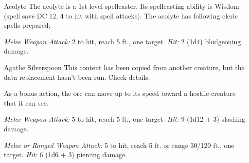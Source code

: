 \documentclass[10pt,a4paper,twoside,bg=print,twocolumn,openany,nodeprecatedcode]{dndbook}
\begin{document}
\begin{DndMonster}[float=t]{Acolyte}
\DndMonsterBasics[
armor-class = {10},
hit-points = {\DndDice{2d8}},
speed = {30 ft.}
]
\DndMonsterAbilityScores[
 str = 10,
 dex = 10,
 con = 10,
 int = 10,
 wis = 14,
 cha = 11
]
\DndMonsterDetails[
skills = {Medicine +4, Religion +2},
languages = {any one language (usually Common)},
challenge = 1/4,
]
The acolyte is a 1st-level spellcaster. Its spellcasting ability is Wisdom (spell save DC 12, 4 to hit with spell attacks). The acolyte has following cleric spells prepared:
\begin{DndMonsterSpells}
\end{DndMonsterSpells}
\textsl{Melee Weapon Attack:} 2 to hit, reach 5 ft., one target. \textsl{Hit:} 2 (1d4) bludgeoning damage.

\end{DndMonster}



\begin{DndMonster}[float=t]{Agathe Silverspoon}
\DndMonsterBasics[
armor-class = {13 (\textit{hide armor})},
hit-points = {\DndDice{2d8 + 6}},
speed = {30 ft.}
]
\DndMonsterAbilityScores[
 str = 16,
 dex = 12,
 con = 16,
 int = 7,
 wis = 11,
 cha = 10
]
\DndMonsterDetails[
skills = {Intimidation +2},
senses = {darkvision 60 ft., passive perception 10},
languages = {Common, Orc},
challenge = 1/2,
]
This content has been copied from another creature, but the data replacement hasn't been run. Check details.

As a bonus action, the orc can move up to its speed toward a hostile creature that it can see.

\textsl{Melee Weapon Attack:} 5 to hit, reach 5 ft., one target. \textsl{Hit:} 9 (1d12 + 3) slashing damage.

\textsl{Melee or Ranged Weapon Attack:} 5 to hit, reach 5 ft. or range 30/120 ft., one target. \textsl{Hit:} 6 (1d6 + 3) piercing damage.

\end{DndMonster}
\end{document}
